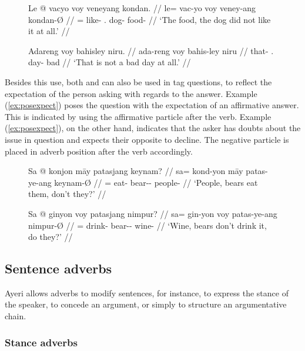 \begin{figure}[h]
\pex\label{ex:voyintens}
\a\begingl
	\gla Le @ vacyo voy veneyang kondan. //
	\glb le= vac-yo voy veney-ang kondan-Ø //
	\glc \PatTI{}= like-\TsgN{} \Int{}.\Neg{} dog-\Aarg{} food-\Top{} //
	\glft `The food, the dog did not like it at all.' //
\endgl

\a\begingl
	\gla Adareng voy bahisley niru. //
	\glb ada-reng voy bahis-ley niru //
	\glc that-\AargI{} \Int{}.\Neg{} day-\PargI{} bad // 
	\glft `That is not a bad day at all.' //
\endgl
\xe
\end{figure}

Besides this use, both  and  can also be used in
tag questions, to reflect the expectation of the person asking with regards to
the answer. Example (\ref{ex:posexpect}) poses the question with the
expectation of an affirmative answer. This is indicated by using the
affirmative particle  after the verb. Example 
(\ref{ex:posexpect}), on the other hand, indicates that the asker has doubts
about the issue in question and expects their opposite to decline. The negative
particle  is placed in adverb position after the verb
accordingly.

\begin{figure}[h]
\pex
\a\label{ex:posexpect}\begingl
	\gla Sa @ konjon māy patasjang keynam? //
	\glb sa= kond-yon māy patas-ye-ang keynam-Ø //
	\glc \PatT{}= eat-\TplN{} \Aff{} bear-\Pl{}-\Aarg{} people-\Top{} //
	\glft `People, bears eat them, don't they?' //
\endgl

\a\label{ex:negexpect}\begingl
	\gla Sa @ ginyon voy patasjang nimpur? //
	\glb sa= gin-yon voy patas-ye-ang nimpur-Ø //
	\glc \PatT{}= drink-\TplN{} \Neg{} bear-\Pl{}-\Aarg{} wine-\Top{} //
	\glft `Wine, bears don't drink it, do they?' //
\endgl
\xe
\end{figure}


\subsection{Sentence adverbs}

Ayeri allows adverbs to modify sentences, for instance, to express the stance
of the speaker, to concede an argument, or simply to structure an argumentative
chain.

\subsubsection{Stance adverbs}

